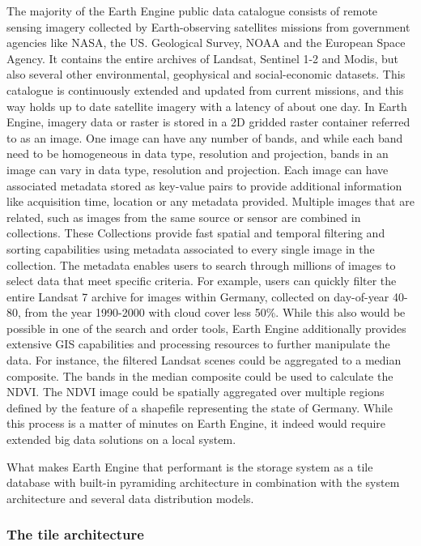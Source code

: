 \documentclass[12pt,twoside,a4paper,final]{report}
\begin{document}
The majority of the Earth Engine public data catalogue consists of remote sensing imagery collected by Earth-observing satellites missions from government agencies like NASA, the US. Geological Survey, NOAA and the European Space Agency. It contains the entire archives of Landsat, Sentinel 1-2 and Modis, but also several other environmental, geophysical and social-economic datasets. This catalogue is continuously extended and updated from current missions, and this way holds up to date satellite imagery with a latency of about one day.
In Earth Engine, imagery data or raster is stored in a 2D gridded raster container referred to as an image. One image can have any number of bands, and while each band need to be homogeneous in data type, resolution and projection, bands in an image can vary in data type, resolution and projection. Each image can have associated metadata stored as key-value pairs to provide additional information like acquisition time, location or any metadata provided.
Multiple images that are related, such as images from the same source or sensor are combined in collections. These Collections provide fast spatial and temporal filtering and sorting capabilities using metadata associated to every single image in the collection. The metadata enables users to search through millions of images to select data that meet specific criteria. For example, users can quickly filter the entire Landsat 7 archive for images within Germany, collected on day-of-year 40-80, from the year 1990-2000 with cloud cover less 50\%. While this also would be possible in one of the search and order tools, Earth Engine additionally provides extensive GIS capabilities and processing resources to further manipulate the data.
For instance, the filtered Landsat scenes could be aggregated to a median composite. The bands in the median composite could be used to calculate the NDVI. The NDVI image could be spatially aggregated over multiple regions defined by the feature of a shapefile representing the state of Germany. While this process is a matter of minutes on Earth Engine, it indeed would require extended big data solutions on a local system.

What makes Earth Engine that performant is the storage system as a tile database with built-in pyramiding architecture in combination with the system architecture and several data distribution models.

\subsubsection{The tile architecture}
\end{document}
